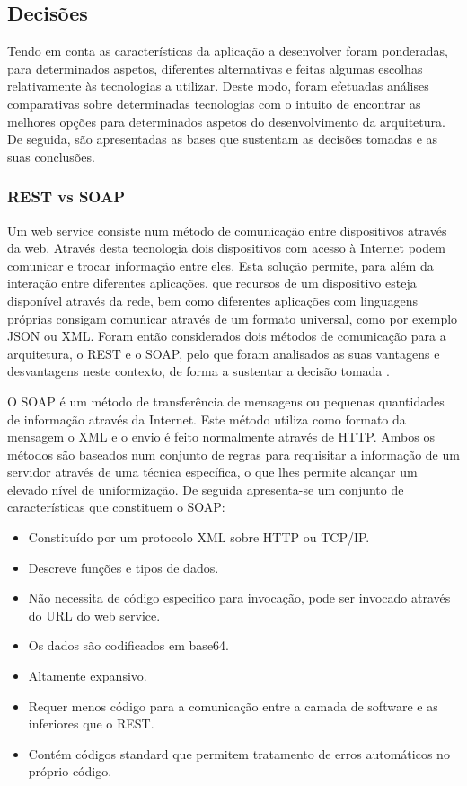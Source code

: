 \subsection{Decisões}

Tendo em conta as características da aplicação a desenvolver foram ponderadas, para determinados aspetos, diferentes alternativas e feitas algumas escolhas relativamente às tecnologias a utilizar. Deste modo, foram efetuadas análises comparativas sobre determinadas tecnologias com o intuito de encontrar as melhores opções para determinados aspetos do desenvolvimento da arquitetura. De seguida, são apresentadas as bases que sustentam as decisões tomadas e as suas conclusões.

\subsubsection{REST vs SOAP}
Um web service consiste num método de comunicação entre dispositivos através da web. Através desta tecnologia dois dispositivos com acesso à Internet podem comunicar e trocar informação entre eles. Esta solução permite, para além da interação entre diferentes aplicações, que recursos de um dispositivo esteja disponível através da rede, bem como diferentes aplicações com linguagens próprias consigam comunicar através de um formato universal, como por exemplo JSON ou XML. Foram então considerados dois métodos de comunicação para a arquitetura, o REST e o SOAP, pelo que foram analisados as suas vantagens e desvantagens neste contexto, de forma a sustentar a decisão tomada \cite{mulligan2009comparison}.

O SOAP é um método de transferência de mensagens ou pequenas quantidades de informação através da Internet. Este método utiliza como formato da mensagem o XML e o envio é feito normalmente através de HTTP. Ambos os métodos são baseados num conjunto de regras para requisitar a informação de um servidor através de uma técnica específica, o que lhes permite alcançar um elevado nível de uniformização. De seguida apresenta-se um conjunto de características que constituem o SOAP:
\begin{itemize}
	\item Constituído por um protocolo XML sobre HTTP ou TCP/IP.
	\item Descreve funções e tipos de dados.
	\item Não necessita de código especifico para invocação, pode ser invocado através do URL do web service.
	\item Os dados são codificados em base64.
	\item Altamente expansivo.
	\item Requer menos código para a comunicação entre a camada de software e as inferiores que o REST.
	\item Contém códigos standard que permitem tratamento de erros automáticos no próprio código.
\end{itemize}

